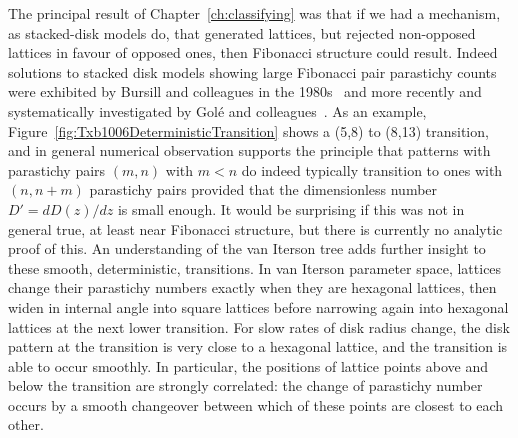 The principal result of Chapter~\ref{ch:classifying} was that if we had a mechanism, as stacked-disk models do, that generated lattices, but rejected non-opposed lattices in favour of opposed ones, then Fibonacci structure could result.   
Indeed solutions to stacked disk models showing large Fibonacci pair parastichy counts were exhibited by Bursill and colleagues in the 1980s~\cite{bursillSpiralLatticeConcepts1987} and more recently and systematically investigated by Gol\'e and colleagues~\cite{goleFibonacciQuasisymmetricPhyllotaxis2016}.
 As an example, Figure~\ref{fig:Txb1006DeterministicTransition} shows a (5,8) to (8,13) transition, and in general numerical observation supports the principle that patterns with parastichy pairs $(m,n)$ with $m<n$ do indeed typically transition to ones with $(n,n+m)$ parastichy pairs provided that the dimensionless number $D'=dD(z)/dz$ is small enough. It would be surprising if this was not in general true, at least near Fibonacci structure, but there is currently no analytic proof of this.
 An understanding of the van Iterson tree adds further insight to these smooth, deterministic, transitions. In van Iterson parameter space, lattices change their parastichy numbers exactly when they are hexagonal lattices, then widen in internal angle into square lattices before narrowing again into hexagonal lattices at the next lower transition.  For slow rates of disk radius change, the disk pattern at the transition is very close to a hexagonal lattice, and the transition is able to occur smoothly. In particular, the positions of lattice points above and below the transition are strongly correlated: the change of parastichy number occurs by a smooth changeover between which of these points are closest to each other. 
 

